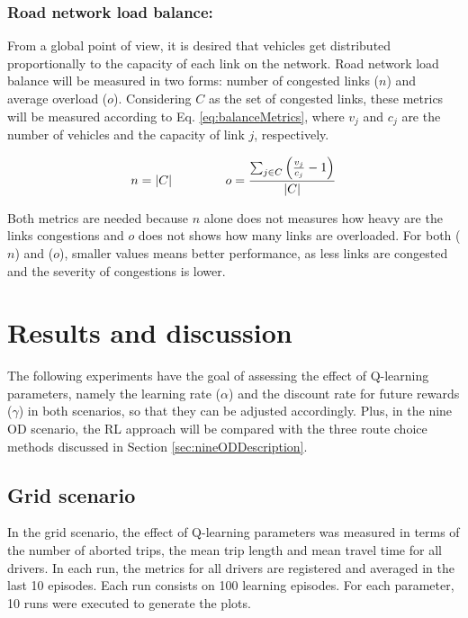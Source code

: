 \documentclass{RITA}
\newcommand{\linkCap}{\ensuremath{c_j}}		%
\newcommand{\veh}{\ensuremath{v}}		%
\newcommand{\congRoads}{\ensuremath{C}}		%
\newcommand{\numCong}{\ensuremath{n}}		%
\newcommand{\overLoadFactor}{\ensuremath{o}}	%
\begin{document}
\subsubsection{Road network load balance:}

From a global point of view, it is desired that vehicles get distributed proportionally to the capacity of each link on the network. Road network load balance will be measured in two forms: number of congested links ($n$) and average overload ($o$). Considering $C$ as the set of congested links, these metrics will be measured according to Eq. \eqref{eq:balanceMetrics}, where $\veh_j$ and $\linkCap$ are the number of vehicles and the capacity of link $j$, respectively. 

\begin{equation}
\label{eq:balanceMetrics}
\numCong = |\congRoads| \hspace{1.5cm}  \overLoadFactor = \frac{ \sum_{\substack{j \in \congRoads}} \left(\frac{\veh_j}{\linkCap} -1 \right)}{|C|}
\end{equation}

Both metrics are needed because $n$ alone does not measures how heavy are the links congestions and $o$ does not shows how many links are overloaded. For both ($n$) and ($o$), smaller values means better performance, as less links are congested and the severity of congestions is lower.

\section{Results and discussion}
\label{sec:results}

The following experiments have the goal of assessing the effect of Q-learning parameters, namely the learning rate ($\alpha$) and the discount rate for future rewards ($\gamma$) in both scenarios, so that they can be adjusted accordingly. Plus, in the nine OD scenario, the RL approach will be compared with the three route choice methods discussed in Section \ref{sec:nineODDescription}.


\subsection{Grid scenario}


In the grid scenario, the effect of Q-learning parameters was measured in terms of the number of aborted trips, the mean trip length and mean travel time for all drivers. In each run, the metrics for all drivers are registered and averaged in the last 10 episodes. Each run consists on 100 learning episodes. For each parameter, 10 runs were executed to generate the plots.
\end{document}
